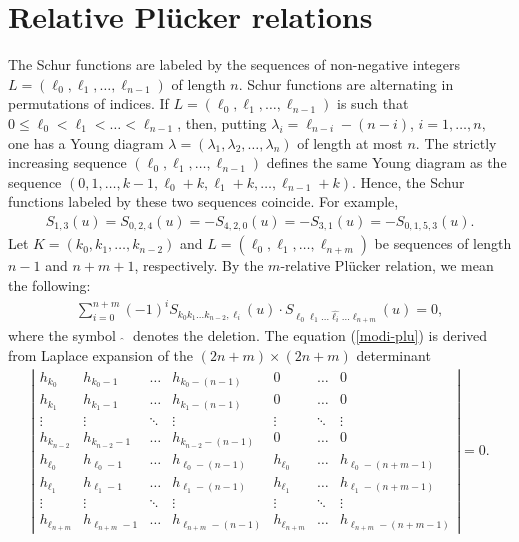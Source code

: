 \documentclass[pdftex]{sigma}
\numberwithin{equation}{section}
\begin{document}
\section{Relative Pl\"ucker relations}\label{section2}
The Schur functions are labeled by the sequences of non-negative integers $L=(\ell_0,\ell_1,\dots,\ell_{n-1})$ of length $n$. Schur functions are alternating in permutations of indices. If $L=(\ell_0,\ell_1,\dots,\ell_{n-1})$ is such that $0\leq\ell_{0}<\ell_{1} <\dots<\ell_{n-1}$, then, putting $\lambda_{i}=\ell_{n-i}-(n-i)$, $i = 1,\dots,n,$ one has a Young diagram $\lambda=(\lambda_1,\lambda_2,\dots,\lambda_{n})$ of length at most $n$. The strictly increasing sequence $(\ell_0,\ell_1,\dots,\ell_{n-1})$ defines the same Young diagram as the sequence $(0,1,\dots,k-1,\allowbreak{\ell_{0}+k}, {\ell_{1}+k},\dots,\ell_{n-1}+k)$. Hence, the Schur functions labeled by these two sequences coincide. For example,
\begin{gather*}
S_{1,3}(u)=S_{0,2,4}(u)=-S_{4,2,0}(u)=-S_{3,1}(u)=-S_{0,1,5,3}(u).
\end{gather*}
Let $K=(k_0,k_1,\dots,k_{n-2})$ and $L=(\ell_{0},\ell_{1},\dots,\ell_{n+m})$ be sequences of length
$n-1$ and $n+m+1$, respectively. By the $m$-relative Pl\"ucker relation, we mean the following:
\begin{gather}
\sum_{i=0}^{n+m}{(-1)}^{i}S_{k_0k_1\dots k_{n-2},\ell_i}(u)\cdot S_{\ell_0\ell_1\dots\widehat{\ell_i}\dots\ell_{n+m}}(u)=0, \label{modi-plu}
\end{gather}
where the symbol \,$\widehat{\ }$\, denotes the deletion. The equation (\ref{modi-plu}) is derived from Laplace expansion of the
$(2n+m) \times (2n+m)$ determinant
\begin{align*}%
\left|\begin{array}{cccc|ccc}
h_{k_0} & h_{k_{0}-1} & \hdots & h_{k_{0}-(n-1)} & 0 & \hdots & 0 \\
h_{k_1} & h_{k_{1}-1} & \hdots & h_{k_{1}-(n-1)} & 0 & \hdots & 0 \\
\vdots & \vdots & \ddots & \vdots & \vdots & \ddots & \vdots \\
h_{k_{n-2}} & h_{k_{n-2}-1} & \hdots & h_{k_{n-2}-(n-1)} & 0 &\hdots & 0 \\
h_{\ell_0} & h_{\ell_{0}-1} & \hdots & h_{\ell_{0}-(n-1)} & h_{\ell_{0}} & \hdots & h_{\ell_{0}-(n+m-1)} \\[1mm]\hline
h_{\ell_1} & h_{\ell_{1}-1} & \hdots & h_{\ell_{1}-(n-1)} & h_{\ell_{1}} & \hdots & h_{\ell_{1}-(n+m-1)} \\
\vdots & \vdots & \ddots & \vdots & \vdots & \ddots & \vdots \\
h_{\ell_{n+m}} & h_{\ell_{n+m}-1} & \hdots & h_{\ell_{n+m}-(n-1)} & h_{\ell_{n+m}} & \hdots & h_{\ell_{n+m}-(n+m-1)}
\end{array}\right|
=0.
\end{align*}
\end{document}
